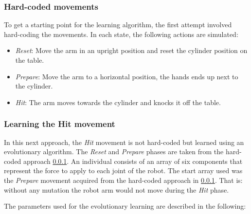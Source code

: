 \subsubsection{Hard-coded movements} \label{sec:prepare_hit_hard}

To get a starting point for the learning algorithm, the first attempt involved hard-coding the movements. In each state, the following actions are simulated:

\begin{itemize}
\item \textit{Reset}: Move the arm in an upright position and reset the cylinder position on the table.
\item \textit{Prepare}: Move the arm to a horizontal position, the hands ends up next to the cylinder.
\item \textit{Hit}: The arm moves towards the cylinder and knocks it off the table.
\end{itemize}

\subsubsection{Learning the Hit movement} \label{sec:prepare_hit_learn_hit}

In this next approach, the \textit{Hit} movement is not hard-coded but learned using an evolutionary algorithm. The \textit{Reset} and \textit{Prepare} phases are taken from the hard-coded approach \ref{sec:prepare_hit_hard}. An individual consists of an array of six components that represent the force to apply to each joint of the robot. The start array used was the \textit{Prepare} movement acquired from the hard-coded approach in \ref{sec:prepare_hit_hard}. That is: without any mutation the robot arm would not move during the \textit{Hit} phase.

The parameters used for the evolutionary learning are described in the following: 

